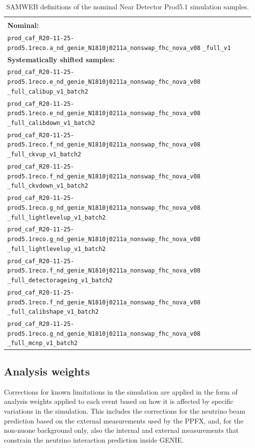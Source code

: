 \begin{table}[!ht]
\centering
\caption{SAMWEB definitions of the nominal Near Detector Prod5.1 simulation samples.}
\begin{tabular}{p{\textwidth}}
\hline\hline\\[-2mm]
\textbf{Nominal:}\\
\texttt{prod\_caf\_R20-11-25-prod5.1reco.a\_nd\_genie\_N1810j0211a\_nonswap\_fhc\_nova\_v08} \texttt{\_full\_v1}\\[7mm]
\textbf{Systematically shifted samples:}\\
\texttt{prod\_caf\_R20-11-25-prod5.1reco.e\_nd\_genie\_N1810j0211a\_nonswap\_fhc\_nova\_v08} \texttt{\_full\_calibup\_v1\_batch2}\\[7mm]
\texttt{prod\_caf\_R20-11-25-prod5.1reco.e\_nd\_genie\_N1810j0211a\_nonswap\_fhc\_nova\_v08} \texttt{\_full\_calibdown\_v1\_batch2}\\[7mm]
\texttt{prod\_caf\_R20-11-25-prod5.1reco.f\_nd\_genie\_N1810j0211a\_nonswap\_fhc\_nova\_v08} \texttt{\_full\_ckvup\_v1\_batch2}\\[7mm]
\texttt{prod\_caf\_R20-11-25-prod5.1reco.f\_nd\_genie\_N1810j0211a\_nonswap\_fhc\_nova\_v08} \texttt{\_full\_ckvdown\_v1\_batch2}\\[7mm]
\texttt{prod\_caf\_R20-11-25-prod5.1reco.g\_nd\_genie\_N1810j0211a\_nonswap\_fhc\_nova\_v08} \texttt{\_full\_lightlevelup\_v1\_batch2}\\[7mm]
\texttt{prod\_caf\_R20-11-25-prod5.1reco.g\_nd\_genie\_N1810j0211a\_nonswap\_fhc\_nova\_v08} \texttt{\_full\_lightlevelup\_v1\_batch2}\\[7mm]
\texttt{prod\_caf\_R20-11-25-prod5.1reco.f\_nd\_genie\_N1810j0211a\_nonswap\_fhc\_nova\_v08} \texttt{\_full\_detectorageing\_v1\_batch2}\\[7mm]
\texttt{prod\_caf\_R20-11-25-prod5.1reco.f\_nd\_genie\_N1810j0211a\_nonswap\_fhc\_nova\_v08} \texttt{\_full\_calibshape\_v1\_batch2}\\[7mm]
\texttt{prod\_caf\_R20-11-25-prod5.1reco.g\_nd\_genie\_N1810j0211a\_nonswap\_fhc\_nova\_v08} \texttt{\_full\_mcnp\_v1\_batch2}\\[7mm]
\hline\hline
\end{tabular}
\label{tab:CAFDefinitions}
\end{table}

\subsection{Analysis weights}
Corrections for known limitations in the simulation are applied in the form of analysis weights applied to each event based on how it is affected by specific variations in the simulation. This includes the corrections for the neutrino beam prediction based on the external measurements used by the \gls{PPFX}, and, for the non-\gls{nuone} background only, also the internal and external measurements that constrain the neutrino interaction prediction inside GENIE.

